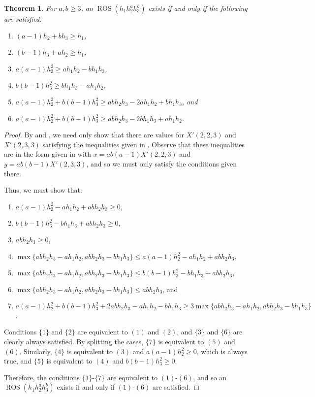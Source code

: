\documentclass[preprint,nonatbib]{elsarticle}
\DeclareMathOperator{\ROS}{ROS}
\newtheorem{theorem}{Theorem}[section]
\theoremstyle{definition}
\numberwithin{equation}{section}
\begin{document}
\begin{theorem}
    For $a,b\geq 3$, an $\ROS(h_1 h_2^a h_3^b)$ exists if and only if the following are satisfied:
    \begin{enumerate}[label=\textup{(\arabic*)}]
        \item $(a-1)h_2 + bh_3\geq h_1$,
        \item $(b-1)h_3 + ah_2\geq h_1$,
        \item $a(a-1)h_2^2\geq ah_1h_2 - bh_1h_3$,
        \item $b(b-1)h_3^2\geq bh_1h_3 - ah_1h_2$,
        \item $a(a-1)h_2^2 + b(b-1)h_3^2 \geq abh_2h_3 - 2ah_1h_2 + bh_1h_3$, and
        \item $a(a-1)h_2^2 + b(b-1)h_3^2 \geq abh_2h_3 - 2bh_1h_3 + ah_1h_2$.
    \end{enumerate}
\end{theorem}
\begin{proof}
    By  and , we need only show that there are values for $X'(2,2,3)$ and $X'(2,3,3)$ satisfying the inequalities given in . Observe that these inequalities are in the form given in  with $x=ab(a-1)X'(2,2,3)$ and $y=ab(b-1)X'(2,3,3)$, and so we must only satisfy the conditions given there.

    Thus, we must show that:
    \begin{enumerate}[label=\textup{\{\arabic*\}}]
        \item $a(a-1)h_2^2 - ah_1h_2 + abh_2h_3\geq 0$,
        \item $b(b-1)h_3^2 - bh_1h_3 + abh_2h_3\geq 0$,
        \item $abh_2h_3\geq 0$,
        \item $\max\{abh_2h_3-ah_1h_2,abh_2h_3-bh_1h_3\} \leq a(a-1)h_2^2 - ah_1h_2 + abh_2h_3$,
        \item $\max\{abh_2h_3-ah_1h_2,abh_2h_3-bh_1h_3\} \leq b(b-1)h_3^2 - bh_1h_3 + abh_2h_3$,
        \item $\max\{abh_2h_3-ah_1h_2,abh_2h_3-bh_1h_3\} \leq abh_2h_3$, and
        \item $a(a-1)h_2^2 + b(b-1)h_3^2 + 2abh_2h_3 - ah_1h_2 - bh_1h_3\geq 3\max\{abh_2h_3-ah_1h_2,abh_2h_3-bh_1h_3\}$.
    \end{enumerate}

    Conditions $\{1\}$ and $\{2\}$ are equivalent to $(1)$ and $(2)$, and $\{3\}$ and $\{6\}$ are clearly always satisfied. By splitting the cases, $\{7\}$ is equivalent to $(5)$ and $(6)$. Similarly, $\{4\}$ is equivalent to $(3)$ and $a(a-1)h_2^2\geq 0$, which is always true, and $\{5\}$ is equivalent to $(4)$ and $b(b-1)h_3^2\geq 0$.

    Therefore, the conditions $\{1\}$-$\{7\}$ are equivalent to $(1)$-$(6)$, and so an $\ROS(h_1 h_2^a h_3^b)$ exists if and only if $(1)$-$(6)$ are satisfied.
\end{proof}
\end{document}
